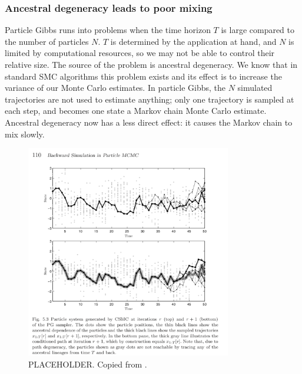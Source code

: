 \subsubsection{Ancestral degeneracy leads to poor mixing}
Particle Gibbs runs into problems when the time horizon $T$ is large compared to the number of particles $N$. $T$ is determined by the application at hand, and $N$ is limited by computational resources, so we may not be able to control their relative size. 
The source of the problem is ancestral degeneracy. 
We know that in standard SMC algorithms this problem exists and its effect is to increase the variance of our Monte Carlo estimates. 
In particle Gibbs, the $N$ simulated trajectories are not used to estimate anything; only one trajectory is sampled at each step, and becomes one state a Markov chain Monte Carlo estimate. Ancestral degeneracy now has a less direct effect: it causes the Markov chain to mix slowly. 

\begin{figure}
\centering
\includegraphics[width=0.8\textwidth]{plots/lindsten_figure.png}
\caption{PLACEHOLDER. Copied from \textcite{lindsten2013}.}
\label{fig:PG_ancdegen}
\end{figure}

